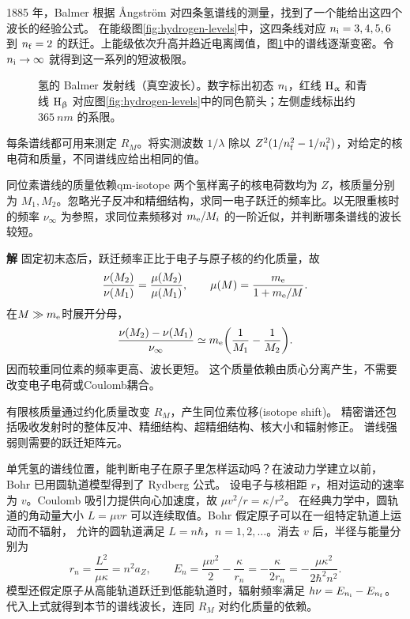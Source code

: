 1885 年，\label{exp:qm-balmer}Balmer 根据 Ångström 对四条氢谱线的测量，找到了一个能给出这四个波长的经验公式\cite{history}。
在能级图\ref{fig:hydrogen-levels}中，这四条线对应 $n_\mathrm i = 3,4,5,6$ 到 $n_\mathrm f = 2$ 的跃迁。上能级依次升高并趋近电离阈值，图\ref{fig:balmer-lines}中的谱线逐渐变密。令 $n_\mathrm i \to \infty$ 就得到这一系列的短波极限。

\begin{figure}[htbp]
    \centering{}
    \caption{氢的 Balmer 发射线（真空波长）。数字标出初态 $n_\mathrm i$，红线 $\mathrm{H}_\upalpha$ 和青线 $\mathrm{H}_\upbeta$ 对应图\ref{fig:hydrogen-levels}中的同色箭头；左侧虚线标出约 $\qty{365}{nm}$ 的系限。}\label{fig:balmer-lines}
\end{figure}
每条谱线都可用来测定 $R_M$。将实测波数 $1/\lambda$ 除以 $Z^2(1/n_\mathrm f^2 - 1/n_\mathrm i^2)$，对给定的核电荷和质量，不同谱线应给出相同的值。

\begin{example}{同位素谱线的质量依赖}{qm-isotope}
    两个氢样离子的核电荷数均为 $Z$，核质量分别为 $M_1,M_2$。忽略光子反冲和精细结构，求同一电子跃迁的频率比。以无限重核时的频率 $\nu_\infty$ 为参照，求同位素频移对 $m_{\mathrm{e}}/M_i$ 的一阶近似，并判断哪条谱线的波长较短。
    \par\smallskip\textbf{解}\quad
    固定初末态后，跃迁频率正比于电子与原子核的约化质量，故
    \begin{equation}
        \frac{\nu(M_2)}{\nu(M_1)}
        = \frac{\mu(M_2)}{\mu(M_1)},
        \qquad
        \mu(M) = \frac{m_{\mathrm{e}}}{1 + m_{\mathrm{e}}/M}.
    \end{equation}
    在$M \gg m_{\mathrm{e}}$时展开分母，
    \begin{equation}
        \frac{\nu(M_2) - \nu(M_1)}{\nu_\infty}
        \simeq m_{\mathrm{e}}\biggl(\frac1{M_1} - \frac1{M_2}\biggr).
    \end{equation}
    因而较重同位素的频率更高、波长更短。
    这个质量依赖由质心分离产生，不需要改变电子电荷或Coulomb耦合。
\end{example}

有限核质量通过约化质量改变 $R_M$，产生同位素位移(isotope shift)。
精密谱还包括吸收发射时的整体反冲、精细结构、超精细结构、核大小和辐射修正。
谱线强弱则需要的跃迁矩阵元。

\label{ss:qm-old-quantum}
单凭氢的谱线位置，能判断电子在原子里怎样运动吗？在波动力学建立以前，Bohr 已用圆轨道模型得到了 Rydberg 公式\cite{bohrlecture}。
设电子与核相距 $r$，相对运动的速率为 $v$。Coulomb 吸引力提供向心加速度，故 $\mu v^2/r = \kappa/r^2$。
在经典力学中，圆轨道的角动量大小 $L = \mu vr$ 可以连续取值。Bohr 假定原子可以在一组特定轨道上运动而不辐射，
允许的圆轨道满足 $L = n\hbar$，$n = 1,2,\ldots$。消去 $v$ 后，半径与能量分别为
\begin{equation}
    r_n = \frac{L^2}{\mu\kappa} = n^2a_Z,\qquad
    E_n = \frac{\mu v^2}{2} - \frac{\kappa}{r_n}
       = -\frac{\kappa}{2r_n} = -\frac{\mu\kappa^2}{2\hbar^2 n^2}.
\end{equation}
模型还假定原子从高能轨道跃迁到低能轨道时，辐射频率满足 $h\nu = E_{n_\mathrm i} - E_{n_\mathrm f}$。
代入上式就得到本节的谱线波长，连同 $R_M$ 对约化质量的依赖。

